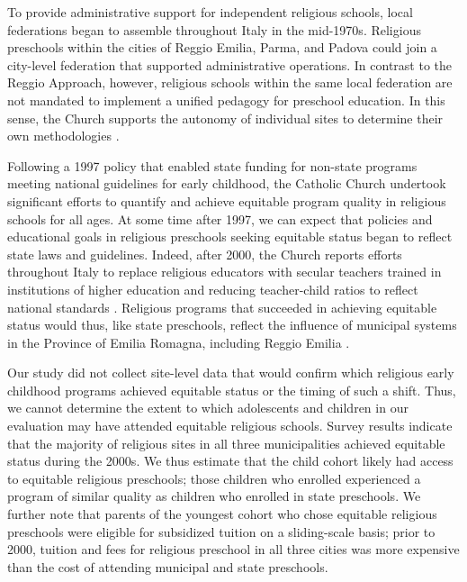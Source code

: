 To provide administrative support for independent religious schools, local federations began to assemble throughout Italy in the mid-1970s. Religious preschools within the cities of Reggio Emilia, Parma, and Padova could join a city-level federation that supported administrative operations. In contrast to the Reggio Approach, however, religious schools within the same local federation are not mandated to implement a unified pedagogy for preschool education. In this sense, the Church supports the autonomy of individual sites to determine their own methodologies \citep{Malizia-Cicatelli_2011_BOOK_Catholic-School}.

Following a 1997 policy that enabled state funding for non-state programs meeting national guidelines for early childhood, the Catholic Church undertook significant efforts to quantify and achieve equitable program quality in religious schools for all ages. At some time after 1997, we can expect that policies and educational goals in religious preschools seeking equitable status began to reflect state laws and guidelines. Indeed, after 2000, the Church reports efforts throughout Italy to replace religious educators with secular teachers trained in institutions of higher education and reducing teacher-child ratios to reflect national standards \citep{Malizia-Cicatelli_2011_BOOK_Catholic-School}. Religious programs that succeeded in achieving equitable status would thus, like state preschools, reflect the influence of municipal systems in the Province of Emilia Romagna, including Reggio Emilia \citep{Hohnerlein_2009_Paradox-Public-Preschools,OECD_2001_Italy-Country-Note}.

Our study did not collect site-level data that would confirm which religious early childhood programs achieved equitable status or the timing of such a shift. Thus, we cannot determine the extent to which adolescents and children in our evaluation may have attended equitable religious schools. Survey results indicate that the majority of religious sites in all three municipalities achieved equitable status during the 2000s. We thus estimate that the child cohort likely had access to equitable religious preschools; those children who enrolled experienced a program of similar quality as children who enrolled in state preschools. We further note that parents of the youngest cohort who chose equitable religious preschools were eligible for subsidized tuition on a sliding-scale basis; prior to 2000, tuition and fees for religious preschool in all three cities was more expensive than the cost of attending municipal and state preschools.

